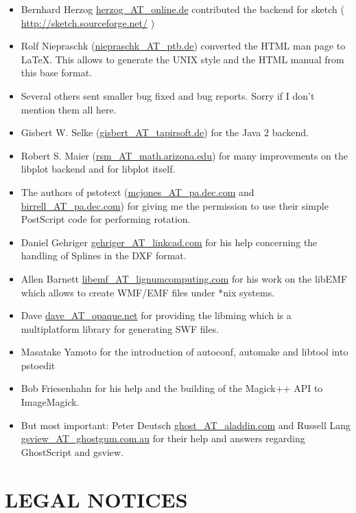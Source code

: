 \documentclass[english,a4paper]{article}
\let\URL\url \let\Email\url \let\File\url
\begin{document}
\begin{itemize}
  \item Bernhard Herzog \Email{herzog_AT_online.de} contributed the backend for
     sketch ( \URL{http://sketch.sourceforge.net/} )

  \item Rolf Niepraschk (\Email{niepraschk_AT_ptb.de}) converted the HTML man page
     to LaTeX. This allows to generate the UNIX style and the HTML manual from this
     base format.

  \item Several others sent smaller bug fixed and bug reports. Sorry if I don't
     mention them all here.

  \item Gisbert W. Selke (\Email{gisbert_AT_tapirsoft.de}) for the Java 2 backend.
     
  \item Robert S. Maier (\Email{rsm_AT_math.arizona.edu}) for many improvements on
	the libplot backend and for libplot itself.
  \item The authors of pstotext (\Email{mcjones_AT_pa.dec.com} and \Email{birrell_AT_pa.dec.com}) 
	for giving me the permission to use their simple PostScript code for 
	performing rotation.
  \item  Daniel Gehriger \Email{gehriger_AT_linkcad.com} for his help concerning the handling of Splines in the DXF format. 
  \item Allen Barnett \Email{libemf_AT_lignumcomputing.com} for his work on the libEMF which allows to create WMF/EMF files under *nix systems.
  \item Dave \Email{dave_AT_opaque.net} for providing the libming which is a multiplatform library for generating SWF files.
  \item Masatake Yamoto for the introduction of autoconf, automake and libtool into pstoedit
  \item Bob Friesenhahn for his help and the building of the Magick++ API to ImageMagick.
  \item But most important: Peter Deutsch \Email{ghost_AT_aladdin.com} and Russell
     Lang \Email{gsview_AT_ghostgum.com.au} for their help and answers regarding
     GhostScript and gsview.

\end{itemize}

\section{LEGAL NOTICES}
\end{document}
